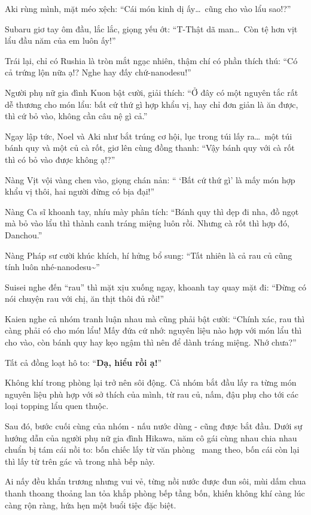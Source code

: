 \documentclass[../main.tex]{subfiles}
\begin{document}
Aki rùng mình, mặt méo xệch: ``Cái món kinh dị ấy\dots\ cũng cho vào lẩu sao!?''

Subaru giơ tay ôm đầu, lắc lắc, giọng yếu ớt: ``T-Thật dã man\dots\ Còn tệ hơn vịt lẩu đầu năm của em luôn ấy!''

Trái lại, chỉ có Rushia là tròn mắt ngạc nhiên, thậm chí có phần thích thú: ``Có cả trứng lộn nữa ạ!? Nghe hay đấy chứ-nanodesu!''

Người phụ nữ gia đình Kuon bật cười, giải thích: ``Ở đây có một nguyên tắc rất dễ thương cho món lẩu: bất cứ thứ gì hợp khẩu vị, hay chỉ đơn giản là ăn được, thì cứ bỏ vào, không cần câu nệ gì cả.''

Ngay lập tức, Noel và Aki như bắt trúng cơ hội, lục trong túi lấy ra\dots\ một túi bánh quy và một củ cà rốt, giơ lên cùng đồng thanh: ``Vậy bánh quy với cà rốt thì có bỏ vào được không ạ!?''

Nàng Vịt vội vàng chen vào, giọng chán nản: `` `Bất cứ thứ gì' là mấy món hợp khẩu vị thôi, hai người đừng có bịa đại!''

Nàng Ca sĩ khoanh tay, nhíu mày phân tích: ``Bánh quy thì dẹp đi nha, đồ ngọt mà bỏ vào lẩu thì thành canh tráng miệng luôn rồi. Nhưng cà rốt thì hợp đó, Danchou.''

Nàng Pháp sư cười khúc khích, hí hửng bổ sung: ``Tất nhiên là cả rau củ cũng tính luôn nhé-nanodesu\~{}''

Suisei nghe đến ``rau'' thì mặt xịu xuống ngay, khoanh tay quay mặt đi: ``Đừng có nói chuyện rau với chị, ăn thịt thôi đủ rồi!''

Kaien nghe cả nhóm tranh luận nhau mà cũng phải bật cười: ``Chính xác, rau thì càng phải có cho món lẩu! Mấy đứa cứ nhớ: nguyên liệu nào hợp với món lẩu thì cho vào, còn bánh quy hay kẹo ngậm thì nên để dành tráng miệng. Nhớ chưa?''

Tất cả đồng loạt hô to: ``\textbf{Dạ, hiểu rồi ạ!}''

Không khí trong phòng lại trở nên sôi động. Cả nhóm bắt đầu lấy ra từng món nguyên liệu phù hợp với sở thích của mình, từ rau củ, nấm, đậu phụ cho tới các loại topping lẩu quen thuộc.

Sau đó, bước cuối cùng của nhóm - nấu nước dùng - cũng được bắt đầu. Dưới sự hướng dẫn của người phụ nữ gia đình Hikawa, năm cô gái cùng nhau chia nhau chuẩn bị tám cái nồi to: bốn chiếc lấy từ văn phòng \hll\ mang theo, bốn cái còn lại thì lấy từ trên gác và trong nhà bếp này.

Ai nấy đều khẩn trương nhưng vui vẻ, từng nồi nước được đun sôi, mùi dấm chua thanh thoang thoảng lan tỏa khắp phòng bếp tầng bốn, khiến không khí càng lúc càng rộn ràng, hứa hẹn một buổi tiệc đặc biệt.
\end{document}
